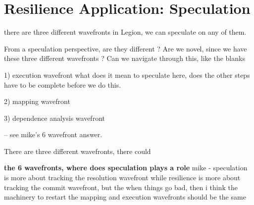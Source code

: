 

\section{Resilience Application: Speculation}
there are three different wavefronts in Legion, we can speculate on any of them. 


From a speculation perspective, are they different ? 
Are we novel, since we have these three different wavefronts ? 
Can we navigate through this, like the blanks 


1) execution wavefront 
what does it mean to speculate here, does the other steps have to be complete before we do this. 


2) mapping wavefront

3) dependence analysis wavefront


-- see mike's 6 wavefront answer.

There are three different wavefronts, there could


\textbf{the 6 wavefronts, where does speculation plays a role} 
mike - speculation is more about tracking the resolution wavefront while resilience is more about tracking the commit wavefront, but the when things go bad, then i think the machinery to restart the mapping and execution wavefronts should be the same

